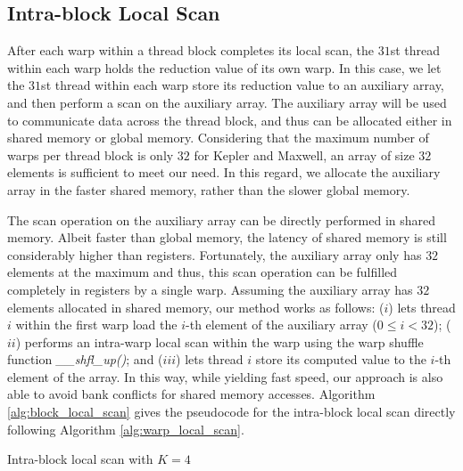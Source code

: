 \documentclass[article]{elsarticle}
\begin{document}
{\subsection{Intra-block Local Scan}
After each warp within a thread block completes its local scan, the $31$st  thread within each warp holds the reduction value of its own warp. In this case, we let the $31$st thread within each warp store its reduction value to an auxiliary array, and then perform a scan on the auxiliary array. The auxiliary array will be used to communicate data across the thread block, and thus can be allocated either in shared memory or global memory. Considering that the maximum number of warps per thread block is only $32$ for Kepler and Maxwell, an array of size $32$ elements is sufficient to meet our need. In this regard, we allocate the auxiliary array in the faster shared memory, rather than the slower global memory.

The scan operation on the auxiliary array can be directly performed in shared memory. Albeit faster than global memory, the latency of shared memory is still considerably higher than registers. Fortunately, the auxiliary array only has $32$ elements at the maximum and thus, this scan operation can be fulfilled completely in registers by a single warp. Assuming the auxiliary array has $32$ elements allocated in shared memory, our method works as follows: ($i$) lets thread $i$ within the first warp load the $i$-th element of the auxiliary array (\mbox{$0\leq i < 32$}); ($ii$) performs an intra-warp local scan within the warp using the warp shuffle function \textit{\_\_shfl\_up()}; and ($iii$) lets thread $i$ store its computed value to the $i$-th element of the array. In this way, while yielding fast speed, our approach is also able to avoid bank conflicts for shared memory accesses. Algorithm \ref{alg:block_local_scan} gives the pseudocode for the intra-block local scan directly following Algorithm \ref{alg:warp_local_scan}.
\begin{algorithm}[!h]
\caption{Intra-block local scan with \mbox{$K=4$}}
\label{alg:block_local_scan}
\begin{algorithmic}[1]
\fontsize{8pt}{8.05pt}\selectfont
{}

    
    \EndIf
    

\end{algorithmic}
\end{algorithm}}
\end{document}
